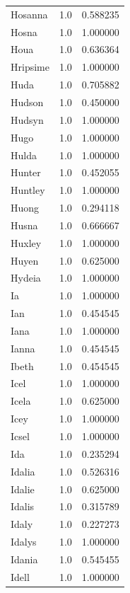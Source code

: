 \documentclass[
  letterpaper,
  DIV=11,
  numbers=noendperiod]{scrreprt}
\begin{document}
\begin{tabular}{lrr}
Hosanna         &   1.0 &   0.588235 \\
Hosna           &   1.0 &   1.000000 \\
Houa            &   1.0 &   0.636364 \\
Hripsime        &   1.0 &   1.000000 \\
Huda            &   1.0 &   0.705882 \\
Hudson          &   1.0 &   0.450000 \\
Hudsyn          &   1.0 &   1.000000 \\
Hugo            &   1.0 &   1.000000 \\
Hulda           &   1.0 &   1.000000 \\
Hunter          &   1.0 &   0.452055 \\
Huntley         &   1.0 &   1.000000 \\
Huong           &   1.0 &   0.294118 \\
Husna           &   1.0 &   0.666667 \\
Huxley          &   1.0 &   1.000000 \\
Huyen           &   1.0 &   0.625000 \\
Hydeia          &   1.0 &   1.000000 \\
Ia              &   1.0 &   1.000000 \\
Ian             &   1.0 &   0.454545 \\
Iana            &   1.0 &   1.000000 \\
Ianna           &   1.0 &   0.454545 \\
Ibeth           &   1.0 &   0.454545 \\
Icel            &   1.0 &   1.000000 \\
Icela           &   1.0 &   0.625000 \\
Icey            &   1.0 &   1.000000 \\
Icsel           &   1.0 &   1.000000 \\
Ida             &   1.0 &   0.235294 \\
Idalia          &   1.0 &   0.526316 \\
Idalie          &   1.0 &   0.625000 \\
Idalis          &   1.0 &   0.315789 \\
Idaly           &   1.0 &   0.227273 \\
Idalys          &   1.0 &   1.000000 \\
Idania          &   1.0 &   0.545455 \\
Idell           &   1.0 &   1.000000 \\

\end{tabular}
\end{document}
